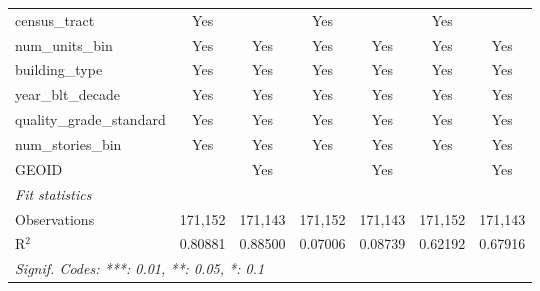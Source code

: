 \begin{tabular}{lcccccc}
   census\_tract                                                   & Yes             &                 & Yes             &                 & Yes             & \\  
   num\_units\_bin                                                 & Yes             & Yes             & Yes             & Yes             & Yes             & Yes\\  
   building\_type                                                  & Yes             & Yes             & Yes             & Yes             & Yes             & Yes\\  
   year\_blt\_decade                                               & Yes             & Yes             & Yes             & Yes             & Yes             & Yes\\  
   quality\_grade\_standard                                        & Yes             & Yes             & Yes             & Yes             & Yes             & Yes\\  
   num\_stories\_bin                                               & Yes             & Yes             & Yes             & Yes             & Yes             & Yes\\  
   GEOID                                                           &                 & Yes             &                 & Yes             &                 & Yes\\  
   \midrule
   \emph{Fit statistics}\\
   Observations                                                    & 171,152         & 171,143         & 171,152         & 171,143         & 171,152         & 171,143\\  
   R$^2$                                                           & 0.80881         & 0.88500         & 0.07006         & 0.08739         & 0.62192         & 0.67916\\  
   \midrule \midrule
   \multicolumn{7}{l}{\emph{Signif. Codes: ***: 0.01, **: 0.05, *: 0.1}}\\
\end{tabular}
\par\endgroup
